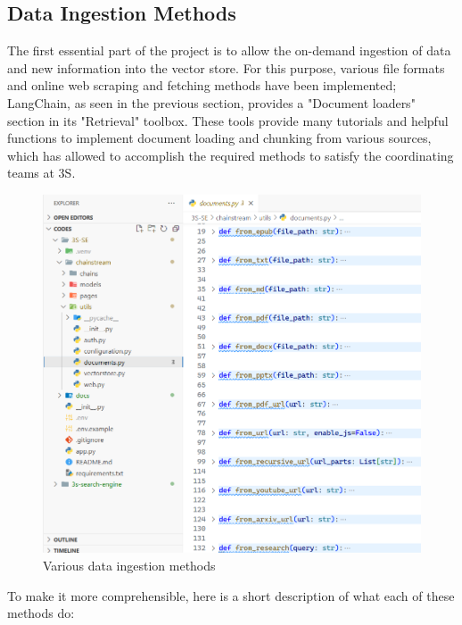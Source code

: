 \subsection{Data Ingestion Methods}
The first essential part of the project is to allow the on-demand ingestion of data and new information into the vector store.\newline
For this purpose, various file formats and online web scraping and fetching methods have been implemented; LangChain, as seen in the previous section, provides a "Document loaders" section in its "Retrieval" toolbox. These tools provide many tutorials and helpful functions to implement document loading and chunking from various sources, which has allowed to accomplish the required methods to satisfy the coordinating teams at 3S.
\begin{figure}[H]
    \centering
    \includegraphics[width=\linewidth]{./figures/data-ingestion-methods.png}
    \caption{Various data ingestion methods}
\end{figure}
To make it more comprehensible, here is a short description of what each of these methods do:
